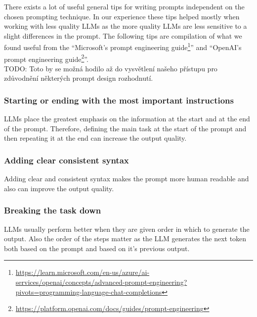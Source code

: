 There exists a lot of useful general tips for writing prompts independent on the chosen prompting technique. In our experience these tips helped mostly when working with less quality LLMs as the more quality LLMs are less sensitive to a slight differences in the prompt. The following tips are compilation of what we found useful from the ``Microsoft's prompt engineering guide\footnote{\url{https://learn.microsoft.com/en-us/azure/ai-services/openai/concepts/advanced-prompt-engineering?pivots=programming-language-chat-completions}}'' and ``OpenAI's prompt engineering guide\footnote{\url{https://platform.openai.com/docs/guides/prompt-engineering}}''. \\

TODO: Toto by se možná hodilo až do vysvětlení našeho přístupu pro zdůvodnění některých prompt design rozhodnutí. \\


\subsubsection{Starting or ending with the most important instructions}
LLMs place the greatest emphasis on the information at the start and at the end of the prompt. Therefore, defining the main task at the start of the prompt and then repeating it at the end can increase the output quality.


\subsubsection{Adding clear consistent syntax}
Adding clear and consistent syntax makes the prompt more human readable and also can improve the output quality.


\subsubsection{Breaking the task down}
LLMs usually perform better when they are given order in which to generate the output. Also the order of the steps matter as the LLM generates the next token both based on the prompt and based on it's previous output.



